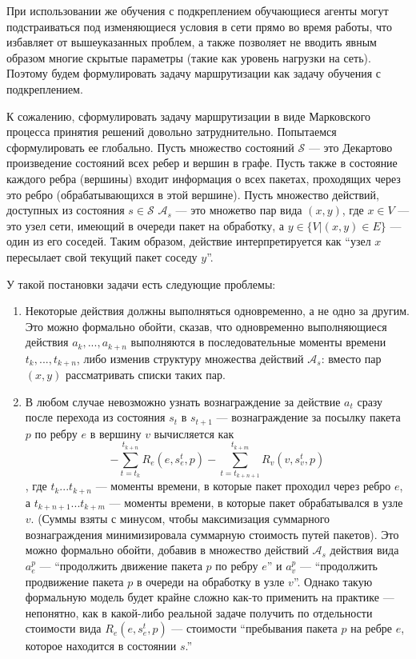 \documentclass[specification, annotation]{itmo-student-thesis}
\begin{document}
При использовании же обучения с подкреплением обучающиеся агенты могут
подстраиваться под изменяющиеся условия в сети прямо во время работы, что
избавляет от вышеуказанных проблем, а также позволяет не вводить явным образом
многие скрытые параметры (такие как уровень нагрузки на сеть). Поэтому будем
формулировать задачу маршрутизации как задачу обучения с подкреплением.

К сожалению, сформулировать задачу маршрутизации в виде Марковского процесса
принятия решений довольно затруднительно. Попытаемся сформулировать ее
глобально. Пусть множество состояний $\mathcal{S}$ --- это Декартово произведение
состояний всех ребер и вершин в графе. Пусть также в состояние каждого ребра
(вершины) входит информация о всех пакетах, проходящих через это ребро
(обрабатывающихся в этой вершине). Пусть множество действий, доступных из
состояния $s \in \mathcal{S}$ $\mathcal{A}_s$ --- это множетво пар вида $(x,y)$,
где $x \in V$ --- это узел сети, имеющий в очереди пакет на обработку, а
$y \in \{V | (x, y) \in E\}$ --- один из его соседей. Таким образом, действие
интерпретируется как ``узел $x$ пересылает свой текущий пакет соседу $y$''.

У такой постановки задачи есть следующие проблемы:
\begin{enumerate}
\item Некоторые действия должны выполняться одновременно, а не одно за другим.
  Это можно формально обойти, сказав, что одновременно выполняющиеся действия
  $a_k, ... , a_{k+n}$ выполняются в последовательные моменты времени
  $t_k, ... , t_{k+n}$, либо изменив структуру множества действий
  $\mathcal{A}_s$: вместо пар $(x, y)$ рассматривать списки таких пар.
\item В любом случае невозможно узнать вознаграждение за действие $a_t$ сразу
  после перехода из состояния $s_t$ в $s_{t+1}$ --- вознаграждение за посылку
  пакета $p$ по ребру $e$ в вершину $v$ вычисляется как
  \[
  - \sum\limits_{t=t_k}^{t_{k+n}} {R_e(e, s_e^t, p)} -
  \sum\limits_{t=t_{k+n+1}}^{t_{k+m}} R_v(v, s_v^t, p)
  \]
  , где $t_k ... t_{k+n}$ --- моменты времени, в которые пакет проходил через
  ребро $e$, а $t_{k+n+1} ... t_{k+m}$ --- моменты времени, в которые пакет
  обрабатывался в узле $v$. (Суммы взяты с минусом, чтобы максимизация
  суммарного вознаграждения минимизировала суммарную стоимость путей пакетов).
  Это можно формально обойти, добавив в множество действий $\mathcal{A}_s$
  действия вида $a_e^p$ --- ``продолжить движение пакета
  $p$ по ребру $e$'' и $a_v^p$ --- ``продолжить продвижение пакета $p$ в очереди на
  обработку в узле $v$''. Однако такую формальную модель будет крайне сложно
  как-то применить на практике --- непонятно, как в какой-либо реальной задаче
  получить по отдельности стоимости вида $R_e(e, s_e^t, p)$ --- стоимости
  ``пребывания пакета $p$ на ребре $e$, которое находится в состоянии $s$.''
\end{enumerate}
\end{document}
